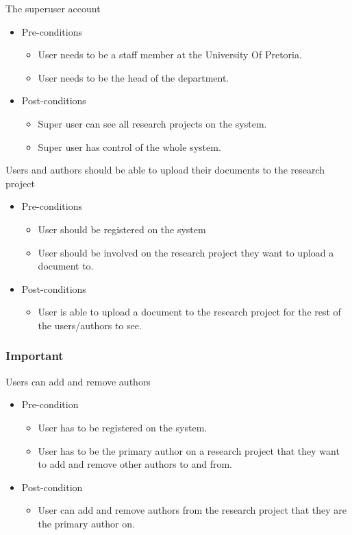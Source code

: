\documentclass[a4paper,12pt]{report}
\begin{document}
	The superuser account
	\begin{itemize}
		\item Pre-conditions
			\begin{itemize}
				\item User needs to be a staff member at the University Of Pretoria.
				\item User needs to be the head of the department.
			\end{itemize}
		\item Post-conditions
			\begin{itemize}
				\item Super user can see all research projects on the system.
				\item Super user has control of the whole system.
			\end{itemize}
	\end{itemize}

	Users and authors should be able to upload their documents to the research project
	\begin{itemize}
		\item Pre-conditions
			\begin{itemize}
				\item User should be registered on the system
				\item User should be involved on the research project they want to upload a document to.
			\end{itemize}
		\item Post-conditions
			\begin{itemize}
				\item User is able to upload a document to the research project for the rest of the users/authors to see.
			\end{itemize}
	\end{itemize}

\subsubsection{Important}
	Users can add and remove authors
	\begin{itemize}
		\item Pre-condition
			\begin{itemize}
				\item User has to be registered on the system.
				\item User has to be the primary author on a research project that they want to add and remove other authors to and from.
			\end{itemize}
		\item Post-condition
			\begin{itemize}
				\item User can add and remove authors from the research project that they are the primary author on.
			\end{itemize}
	\end{itemize}
\end{document}
